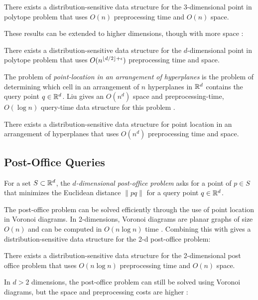 \documentclass{patmorin}
\begin{document}
\begin{thm}
  There exists a distribution-sensitive data structure for the
  3-dimensional point in polytope problem that uses $O(n)$ preprocessing
  time and $O(n)$ space.
\end{thm}

These results can be extended to higher dimensions, though with more
space \cite{c88}:

\begin{thm}
  There exists a distribution-sensitive data structure for
  the $d$-dimensional point in polytope problem that uses
  $O(n^{{\left\lfloor d/2 \right\rfloor}+\epsilon})$ preprocessing time and space.
\end{thm}

The problem of \emph{point-location in an arrangement of hyperplanes} is
the problem of determining which cell in an arrangement of $n$ hyperplanes
in $\mathbb{R}^d$ contains the query point $q\in\mathbb{R}^d$.  Liu gives an $O(n^d)$
space and preprocessing-time, $O(\log n)$ query-time data structure for
this problem \cite{l04}.

\begin{thm}
  There exists a distribution-sensitive data structure for point location
  in an arrangement of hyperplanes that uses $O(n^d)$ preprocessing time
  and space.
\end{thm}

\subsection{Post-Office Queries}

For a set $S\subset\mathbb{R}^d$, the \emph{$d$-dimensional post-office problem}
asks for a point of $p\in S$ that minimizes the Euclidean distance
$\|pq\|$ for a query point $q\in\mathbb{R}^d$.

The post-office problem can be solved efficiently through the use of
point location in Voronoi diagrams.  In 2-dimensions, Voronoi diagrams
are planar graphs of size $O(n)$ and can be computed in $O(n\log n)$ time
\cite{ps85}.  Combining this with  gives
a distribution-sensitive data structure for the 2-d post-office problem:

\begin{thm}
  There exists a distribution-sensitive data structure for the
  2-dimensional post office problem that uses $O(n\log n)$ preprocessing
  time and $O(n)$ space.
\end{thm}

In $d >2$ dimensions, the post-office problem can still be solved using
Voronoi diagrams, but the space and preprocessing costs are higher
\cite{c88postoffice}:
\end{document}
